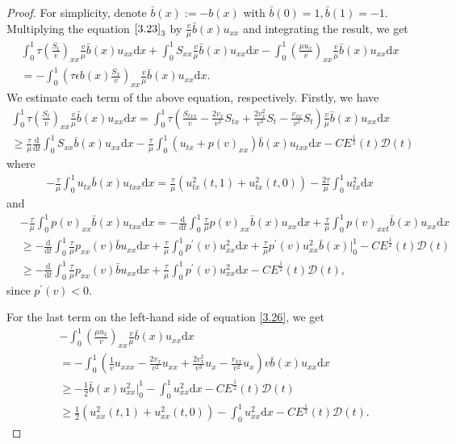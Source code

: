 \documentclass[10pt,reqno]{amsart}
\numberwithin{equation}{section}
\newcommand{\dif}{\mathrm{d}}
\begin{document}
\begin{proof}
 For simplicity, denote $\bar b(x):=-b(x)$ with $\bar b(0)=1, \bar b (1)=-1$. Multiplying the  equation $\eqref{3.23}_3$ by $\frac{v}{\mu} \bar b(x) u_{xx}$ and integrating the result, we get
\begin{align}
\int_0^1 \tau \left(\frac{S_t}{v}\right)_{xx} \frac{v}{\mu} \bar b(x) u_{xx} \dif x+\int_0^1 S_{xx}\frac{v}{\mu}\bar b(x) u_{xx} \dif x 
-\int_0^1 \left(\frac{\mu u_x}{v}\right)_{xx} \frac{v}{\mu} \bar b(x) u_{xx} \dif x \nonumber\\
=-\int_0^1\left( \tau\epsilon b(x) \frac{S_x}{v}\right)_{xx} \frac{v}{\mu} \bar b(x) u_{xx}\dif x . \label{3.26}
\end{align}
We estimate each term of the above equation, respectively. Firstly, we have
\begin{align*}
\int_0^1 \tau\left(\frac{S_t}{v}\right)_{xx} \frac{v}{\mu} \bar b(x) u_{xx} \dif x
=\int_0^1 \tau \left(\frac{S_{txx}}{v}-\frac{2v_x}{v^2} S_{tx}+\frac{2v_x^2}{v^3} S_t-\frac{v_{xx}}{v^2} S_t\right)\frac{v}{\mu} \bar b(x) u_{xx}\dif x\\
\ge \frac{\tau}{\mu} \frac{\dif}{\dif t}\int_0^1 S_{xx} \bar b(x) u_{xx}\dif x -\frac{\tau}{\mu}\int_0^1 (u_{tx}+p(v)_{xx}) \bar b(x) u_{txx}\dif x -C E^\frac{1}{2}(t) \mathcal D(t)
\end{align*}
where
\begin{align*}
-\frac{\tau}{\mu} \int_0^1 u_{tx} \bar b(x) u_{txx}\dif x=\frac{\tau}{\mu} (u_{tx}^2(t,1)+u_{tx}^2(t, 0)) -\frac{2\tau}{\mu}\int_0^1  u_{tx}^2\dif x 
\end{align*}
and
\begin{align*}
&-\frac{\tau}{\mu} \int_0^1 p(v)_{xx} \bar b(x) u_{txx}\dif x=-\frac{\dif}{\dif t} \int_0^1 \frac{\tau}{\mu}  p(v)_{xx}\bar b(x) u_{xx} \dif x+\frac{\tau}{\mu}\int_0^1 p(v)_{xxt} \bar b(x)u_{xx}\dif x\\
&\ge-\frac{\dif}{\dif t}\int_0^1 \frac{\tau}{\mu} p_{xx}(v) \bar b u_{xx}\dif x +\frac{\tau}{\mu} \int_0^1 p^\prime(v)u_{xx}^2\dif x +\frac{\tau}{\mu} p^\prime(v) u_{xx}^2 \bar b(x)\big|_0^1-CE^\frac{1}{2}(t)\mathcal D(t)\\
 &\ge-\frac{\dif}{\dif t}\int_0^1 \frac{\tau}{\mu} p_{xx}(v) \bar b u_{xx}\dif x +\frac{\tau}{\mu} \int_0^1 p^\prime(v)u_{xx}^2\dif x-CE^\frac{1}{2}(t)\mathcal D(t),
\end{align*} 
since $p^\prime(v)<0$. 

For the last term on the left-hand side of equation \eqref{3.26}, we get
\begin{align*}
&-\int_0^1 \left(\frac{\mu u_x}{v}\right)_{xx} \frac{v}{\mu} \bar b(x) u_{xx}\dif x\\
&=-\int_0^1\left(\frac{1}{v} u_{xxx}-\frac{2v_x}{v^2} u_{xx}+\frac{2v_x^2}{v^3} u_x-\frac{v_{xx}}{v^2}u_x\right)v \bar b(x)u_{xx}\dif x\\
&\ge -\frac{1}{2}\bar b(x) u_{xx}^2 \big|_0^1-\int_0^1 u_{xx}^2\dif x-CE^\frac{1}{2}(t)\mathcal D(t)\\
&\ge \frac{1}{2} (u_{xx}^2(t,1)+u_{xx}^2(t, 0))-\int_0^1 u_{xx}^2 \dif x-CE^\frac{1}{2}(t)\mathcal D(t).
\end{align*}




\end{proof}
\end{document}
